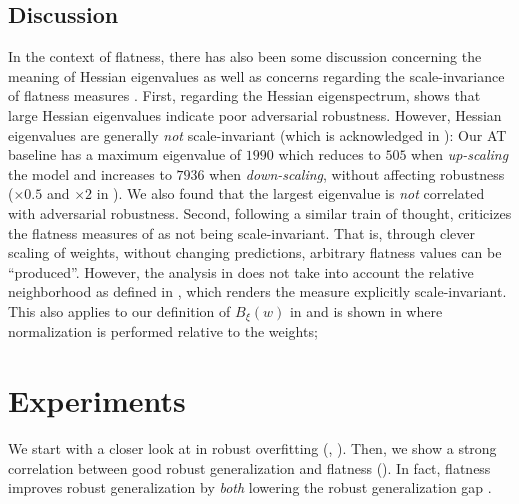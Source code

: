 \subsection{Discussion}
\label{subsec:main-discussion}

In the context of flatness, there has also been some discussion concerning the meaning of Hessian eigenvalues \cite{LiNIPS2018,YaoNIPS2018} as well as concerns regarding the scale-invariance of flatness measures \cite{DinhICML2017}. First, regarding the Hessian eigenspectrum,
\cite{YaoNIPS2018} shows that large Hessian eigenvalues indicate poor adversarial robustness. However, Hessian eigenvalues are generally \emph{not} scale-invariant (which is acknowledged in \cite{YaoNIPS2018}): Our AT baseline has a maximum eigenvalue of $1990$ which reduces to $505$ when \emph{up-scaling} the model and increases to $7936$ when \emph{down-scaling}, without affecting robustness (\cf $\times0.5$ and $\times2$ in ). We also found that the largest eigenvalue is \emph{not} correlated with adversarial robustness. Second, following a similar train of thought, \cite{DinhICML2017} criticizes the flatness measures of \cite{NeyshaburNIPS2017,KeskarICLR2017} as not being scale-invariant. That is, through clever scaling of weights, without changing predictions, arbitrary flatness values can be ``produced''. However, the analysis in \cite{DinhICML2017} does not take into account the relative neighborhood as defined in \cite{KeskarICLR2017}, which renders the measure explicitly scale-invariant. This also applies to our definition of $B_\xi(w)$ in  and is shown in  where normalization is performed relative  to the weights; 

\section{Experiments}
\label{sec:experiments}

We start with a closer look at \RCE in robust overfitting (, ). Then, we show a strong correlation between good robust generalization and flatness ().  In fact, flatness improves robust generalization by \emph{both} lowering the robust generalization gap .

